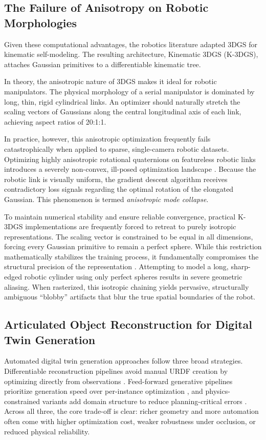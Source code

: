 \documentclass[12pt,a4paper,oneside]{report}
\begin{document}
\subsection{The Failure of Anisotropy on Robotic Morphologies}
Given these computational advantages, the robotics literature adapted 3DGS for kinematic self-modeling. The resulting architecture, Kinematic 3DGS (K-3DGS), attaches Gaussian primitives to a differentiable kinematic tree.

In theory, the anisotropic nature of 3DGS makes it ideal for robotic manipulators. The physical morphology of a serial manipulator is dominated by long, thin, rigid cylindrical links. An optimizer should naturally stretch the scaling vectors of Gaussians along the central longitudinal axis of each link, achieving aspect ratios of 20:1:1.

In practice, however, this anisotropic optimization frequently fails catastrophically when applied to sparse, single-camera robotic datasets. Optimizing highly anisotropic rotational quaternions on featureless robotic links introduces a severely non-convex, ill-posed optimization landscape \cite{hu2025learning}. Because the robotic link is visually uniform, the gradient descent algorithm receives contradictory loss signals regarding the optimal rotation of the elongated Gaussian. This phenomenon is termed \textit{anisotropic mode collapse}.

To maintain numerical stability and ensure reliable convergence, practical K-3DGS implementations are frequently forced to retreat to purely isotropic representations. The scaling vector is constrained to be equal in all dimensions, forcing every Gaussian primitive to remain a perfect sphere. While this restriction mathematically stabilizes the training process, it fundamentally compromises the structural precision of the representation \cite{hu2025learning}. Attempting to model a long, sharp-edged robotic cylinder using only perfect spheres results in severe geometric aliasing. When rasterized, this isotropic chaining yields pervasive, structurally ambiguous ``blobby'' artifacts that blur the true spatial boundaries of the robot.

\subsection{Articulated Object Reconstruction for Digital Twin Generation}
Automated digital twin generation approaches follow three broad strategies. Differentiable reconstruction pipelines avoid manual URDF creation by optimizing directly from observations \cite{heiden2022inferring, weng2024neural}. Feed-forward generative pipelines prioritize generation speed over per-instance optimization \cite{li2025art, wu2025urdfanything, wang2025artllm, wang2025kinematify}, and physics-constrained variants add domain structure to reduce planning-critical errors \cite{zhang2025simart, xu2025motionanymesh, wu2024aomgen}. Across all three, the core trade-off is clear: richer geometry and more automation often come with higher optimization cost, weaker robustness under occlusion, or reduced physical reliability.
\end{document}
